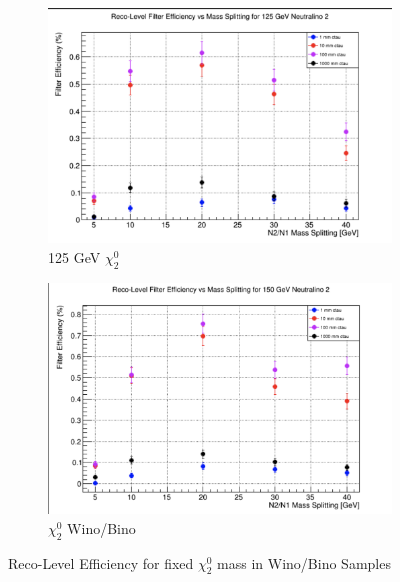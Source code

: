\documentclass{article}
\begin{document}
\begin{figure} [H]
\begin{subfigure}{.5\textwidth}
  \centering
  \includegraphics[width=.8\linewidth]{125GeVWinoEff.png}  
  \caption{125 GeV $\chi_{2}^{0}$}
  \label{fig:sub-first19}
\end{subfigure}
\begin{subfigure}{.5\textwidth}
  \centering
  \includegraphics[width=.8\linewidth]{150GeVWinoEff.png}  
  \caption{$\chi_{2}^{0}$ Wino/Bino}
  \label{fig:sub-second19}
\end{subfigure}
\caption{Reco-Level Efficiency for fixed $\chi_{2}^{0}$ mass in Wino/Bino Samples}
\label{fig:25}
\end{figure}
\end{document}
